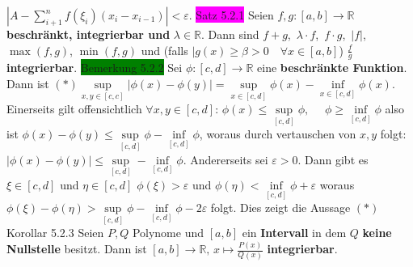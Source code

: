 \documentclass[landscape, 10pt]{article}
\newcommand{\R}{\mathbb{R}}
\begin{document}
\begin{multicols}{3}
                \textcolor{NavyBlue}{$|A-\sum_{i+1}^nf(\xi_i)(x_i-x_{i-1})|<\varepsilon$}. 
\colorbox{magenta}{Satz 5.2.1} Seien \textcolor{NavyBlue}{$f,g:[a,b]\longrightarrow\R$} 
                \textbf{beschränkt, integrierbar und} 
                \textcolor{NavyBlue}{$\lambda\in\R$}. 
                Dann sind \textcolor{NavyBlue}{$f+g$},\,
                \textcolor{NavyBlue}{$\lambda\cdot f$},\,
                \textcolor{NavyBlue}{$f\cdot g$},\,
                \textcolor{NavyBlue}{$|f|$},\,\textcolor{NavyBlue}{$\max(f,g)$},
         \textcolor{NavyBlue}{$\min(f,g)$} und (falls 
                \textcolor{NavyBlue}{$|g(x)\geqslant\beta>0\quad\forall x\in[a,b]$})
                \textcolor{NavyBlue}{$\frac{f}{g}$}
                \textbf{integrierbar}.
\colorbox{green}{Bemerkung 5.2.2} Sei 
                \textcolor{NavyBlue}{$\phi:[c,d]\longrightarrow\R$} 
                eine \textbf{beschränkte Funktion}. Dann ist 
         $(*)$\textcolor{NavyBlue}{$\sup\limits_{x,y\in[c,c]}|\phi(x)-\phi(y)|
                =\sup\limits_{x\in[c,d]}\phi(x)-\inf\limits_{x\in[c,d]}\phi(x)$}.
                Einerseits gilt offensichtlich 
                \textcolor{NavyBlue}{$\forall x,y\in[c,d]$}: 
         \textcolor{NavyBlue}{$\phi(x)\leqslant\sup\limits_{[c,d]}\phi,$}
                \textcolor{NavyBlue}{$\quad\phi\geqslant\inf\limits_{[c,d]}\phi$}
                also ist \textcolor{NavyBlue}{
                $\phi(x)-\phi(y)\leqslant\sup\limits_{[c,d]}\phi-\inf\limits_{[c,d]}\phi$}, 
                woraus durch vertauschen von \textcolor{NavyBlue}{$x,y$} folgt: 
         \textcolor{NavyBlue}{
                $|\phi(x)-\phi(y)|\leqslant\sup\limits_{[c,d]}-\inf\limits_{[c,d]}\phi$}. 
                Andererseits sei \textcolor{NavyBlue}{$\varepsilon>0$}. 
                Dann gibt es \textcolor{NavyBlue}{$\xi\in[c,d]$}
                und \textcolor{NavyBlue}{$\eta\in[c,d]$ $\phi(\xi)>\varepsilon$} und 
         \textcolor{NavyBlue}{$\phi(\eta)<\inf\limits_{[c,d]}\phi+\varepsilon$} 
                woraus 
                \textcolor{NavyBlue}{$\phi(\xi)-\phi(\eta)
                >\sup\limits_{[c,d]}\phi-\inf\limits_{[c,d]}\phi-2\varepsilon$}
                folgt. Dies zeigt die Aussage $(*)$ 
\colorbox{BurntOrange}{Korollar 5.2.3} Seien \textcolor{NavyBlue}{$P,Q$} Polynome und 
                \textcolor{NavyBlue}{$[a,b]$}
                ein \textbf{Intervall} in dem \textcolor{NavyBlue}{$Q$} 
                \textbf{keine Nullstelle} besitzt. Dann ist 
         \textcolor{NavyBlue}{
                $[a,b]\longrightarrow\R,\,x\mapsto\frac{P(x)}{Q(x)}$}
                \textbf{integrierbar}.

\end{multicols}
\end{document}
